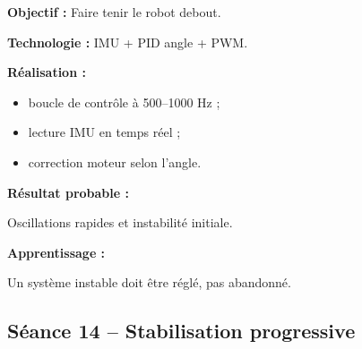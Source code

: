 \documentclass[11pt,a4paper]{article}
\begin{document}
	\begin{sessionbox}
		
		\textbf{Objectif :} Faire tenir le robot debout.
		
		\vspace{0.3cm}
		
		\textbf{Technologie :} IMU + PID angle + PWM.
		
		\vspace{0.3cm}
		
		\textbf{Réalisation :}
		
		\begin{itemize}
			\item boucle de contrôle à 500--1000 Hz ;
			\item lecture IMU en temps réel ;
			\item correction moteur selon l'angle.
		\end{itemize}
		
		\vspace{0.3cm}
		
		\textbf{Résultat probable :}
		
		Oscillations rapides et instabilité initiale.
		
		\vspace{0.3cm}
		
		\textbf{Apprentissage :}
		
		Un système instable doit être réglé, pas abandonné.
		
	\end{sessionbox}
	
	\subsection*{Séance 14 -- Stabilisation progressive}
	
\end{document}
